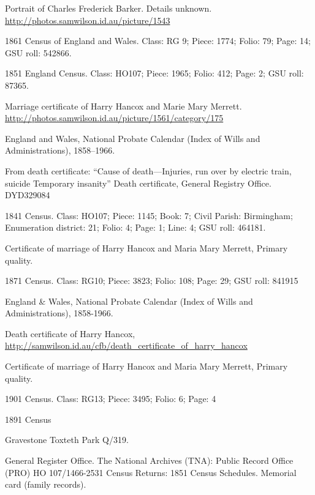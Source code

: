 \begin{thebibliography}{99}
	Portrait of Charles Frederick Barker. Details unknown.
	\url{http://photos.samwilson.id.au/picture/1543}

	1861 Census of England and Wales.
	Class: RG 9; Piece: 1774; Folio: 79; Page: 14; GSU roll: 542866.

	1851 England Census.
	Class: HO107; Piece: 1965; Folio: 412; Page: 2; GSU roll: 87365.

	Marriage certificate of Harry Hancox and Marie Mary Merrett.
	\url{http://photos.samwilson.id.au/picture/1561/category/175}

	England and Wales, National Probate Calendar (Index of Wills and Administrations), 1858--1966.

	From death certificate: ``Cause of death---Injuries, run over by electric train, suicide Temporary insanity''
	Death certificate, General Registry Office. DYD329084
	
	1841 Census. 
	Class: HO107; Piece: 1145; Book: 7; Civil Parish: Birmingham; Enumeration district: 21; Folio: 4; Page: 1; Line: 4; GSU roll: 464181.

	Certificate of marriage of Harry Hancox and Maria Mary Merrett, Primary quality. 
	
	1871 Census.
	Class: RG10; Piece: 3823; Folio: 108; Page: 29; GSU roll: 841915

	England \& Wales, National Probate Calendar (Index of Wills and Administrations), 1858-1966.

	Death certificate of Harry Hancox,
	\url{http://samwilson.id.au/cfb/death_certificate_of_harry_hancox}

	Certificate of marriage of Harry Hancox and Maria Mary Merrett, Primary quality.

	1901 Census.
	Class: RG13; Piece: 3495; Folio: 6; Page: 4

	1891 Census
	
	Gravestone Toxteth Park Q/319. 
	
	General Register Office. The National Archives (TNA): Public Record Office (PRO) HO 107/1466-2531 Census Returns: 1851 Census Schedules.
	Memorial card (family records). 
	

\end{thebibliography}
